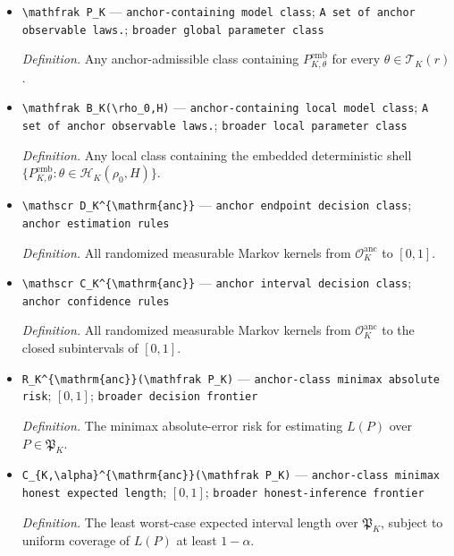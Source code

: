 \documentclass{article}
\begin{document}
\begin{itemize}
  \item \texttt{\textbackslash{}\allowbreak{}mathfrak P\_\allowbreak{}K} --- \texttt{anchor-\allowbreak{}containing model class}; \texttt{A set of anchor observable laws.}; \texttt{broader global parameter class}
  \par\smallskip\noindent\emph{Definition.} Any anchor-admissible class containing \(P_{K,\theta}^{\mathrm{emb}}\) for every \(\theta\in\mathcal T_K(r)\).
  \item \texttt{\textbackslash{}\allowbreak{}mathfrak B\_\allowbreak{}K(\textbackslash{}\allowbreak{}rho\_\allowbreak{}0,\allowbreak{}H)} --- \texttt{anchor-\allowbreak{}containing local model class}; \texttt{A set of anchor observable laws.}; \texttt{broader local parameter class}
  \par\smallskip\noindent\emph{Definition.} Any local class containing the embedded deterministic shell \(\{P_{K,\theta}^{\mathrm{emb}}:\theta\in\mathcal H_K(\rho_0,H)\}\).
  \item \texttt{\textbackslash{}\allowbreak{}mathscr D\_\allowbreak{}K\textasciicircum{}\{\textbackslash{}\allowbreak{}mathrm\{anc\}\allowbreak{}\}\allowbreak{}} --- \texttt{anchor endpoint decision class}; \texttt{anchor estimation rules}
  \par\smallskip\noindent\emph{Definition.} All randomized measurable Markov kernels from \(\mathcal O_K^{\mathrm{anc}}\) to \([0,1]\).
  \item \texttt{\textbackslash{}\allowbreak{}mathscr C\_\allowbreak{}K\textasciicircum{}\{\textbackslash{}\allowbreak{}mathrm\{anc\}\allowbreak{}\}\allowbreak{}} --- \texttt{anchor interval decision class}; \texttt{anchor confidence rules}
  \par\smallskip\noindent\emph{Definition.} All randomized measurable Markov kernels from \(\mathcal O_K^{\mathrm{anc}}\) to the closed subintervals of \([0,1]\).
  \item \texttt{R\_\allowbreak{}K\textasciicircum{}\{\textbackslash{}\allowbreak{}mathrm\{anc\}\allowbreak{}\}\allowbreak{}(\textbackslash{}\allowbreak{}mathfrak P\_\allowbreak{}K)} --- \texttt{anchor-\allowbreak{}class minimax absolute risk}; \([0,1]\); \texttt{broader decision frontier}
  \par\smallskip\noindent\emph{Definition.} The minimax absolute-error risk for estimating \(L(P)\) over \(P\in\mathfrak P_K\).
  \item \texttt{C\_\allowbreak{}\{K,\allowbreak{}\textbackslash{}\allowbreak{}alpha\}\allowbreak{}\textasciicircum{}\{\textbackslash{}\allowbreak{}mathrm\{anc\}\allowbreak{}\}\allowbreak{}(\textbackslash{}\allowbreak{}mathfrak P\_\allowbreak{}K)} --- \texttt{anchor-\allowbreak{}class minimax honest expected length}; \([0,1]\); \texttt{broader honest-\allowbreak{}inference frontier}
  \par\smallskip\noindent\emph{Definition.} The least worst-case expected interval length over \(\mathfrak P_K\), subject to uniform coverage of \(L(P)\) at least \(1-\alpha\).
\end{itemize}
\end{document}
